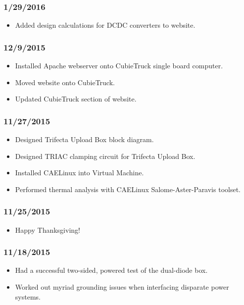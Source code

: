 \subsubsection{1/29/2016}

\begin{itemize}
\item Added design calculations for DCDC converters to website.
\end{itemize}

\subsubsection{12/9/2015}

\begin{itemize}
\item Installed Apache webserver onto CubieTruck single board computer.
\item Moved website onto CubieTruck.
\item Updated CubieTruck section of website.
\end{itemize}

\subsubsection{11/27/2015}

\begin{itemize}
\item Designed Trifecta Upload Box block diagram.
\item Designed TRIAC clamping circuit for Trifecta Upload Box.
\item Installed CAELinux into Virtual Machine.
\item Performed thermal analysis with CAELinux Salome-Aster-Paravis toolset.
\end{itemize}

\subsubsection{11/25/2015}

\begin{itemize}
\item Happy Thanksgiving!
\end{itemize}

\subsubsection{11/18/2015}

\begin{itemize}
\item Had a successful two-sided, powered test of the dual-diode box.
\item Worked out myriad grounding issues when interfacing disparate power systems.
\end{itemize}

